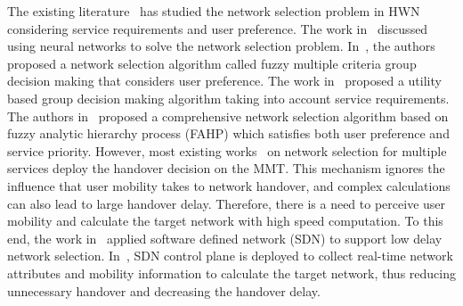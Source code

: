 \documentclass[conference]{IEEEtran}
\begin{document}

The existing literature~\cite{MCGDM,Utility-GDM,select,tutorial} has studied the network selection problem in HWN considering service requirements and user preference.
The work in~\cite{tutorial} discussed using neural networks to solve the network selection problem.
In~\cite{MCGDM}, the authors proposed a network selection algorithm called fuzzy multiple criteria group decision making that considers user preference.
The work in~\cite{Utility-GDM} proposed a utility based group decision making algorithm taking into account service requirements.  
The authors in~\cite{select} proposed a comprehensive network selection algorithm based on fuzzy analytic hierarchy process (FAHP) which satisfies both user preference and service priority. 
However, most existing works~\cite{MCGDM,Utility-GDM,select} on network selection for multiple services deploy the handover decision on the MMT. This mechanism ignores the influence that user mobility takes to network handover, and complex calculations can also lead to large handover delay.  
Therefore, there is a need to perceive user mobility and calculate the target network with high speed computation. 
To this end, the work in~\cite{2interface}  applied software defined network (SDN) to support low delay network selection.
In~\cite{speedup}, SDN control plane is deployed to collect real-time network attributes and mobility information to calculate the target network, thus reducing unnecessary handover and decreasing the handover delay.   
 

\end{document}
